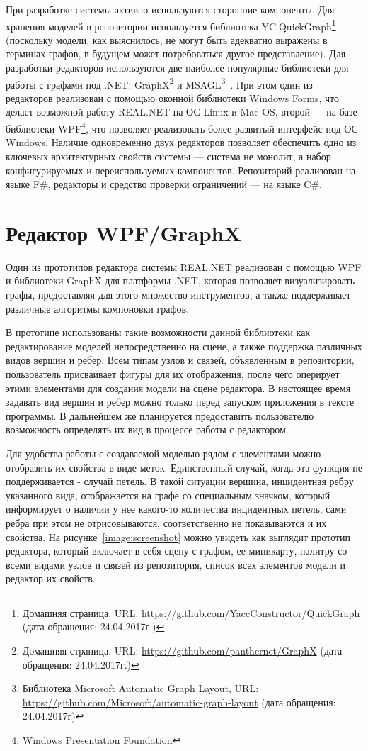\documentclass{spisok-article}
\begin{document}
При разработке системы активно используются сторонние компоненты. Для хранения моделей в репозитории используется библиотека YC.QuickGraph\footnote{Домашняя страница, URL: \url{https://github.com/YaccConstructor/QuickGraph} (дата обращения: 24.04.2017г.)} (поскольку модели, как выяснилось, не могут быть адекватно выражены в терминах графов, в будущем может потребоваться другое представление). Для разработки редакторов используются две наиболее популярные библиотеки для работы с графами под .NET: GraphX\footnote{Домашняя страница, URL: \url{https://github.com/panthernet/GraphX} (дата обращения: 24.04.2017г.)} и MSAGL\footnote{Библиотека Microsoft Automatic Graph Layout, URL: \url{https://github.com/Microsoft/automatic-graph-layout} (дата обращения: 24.04.2017г)}~\cite{pupyrev2010bundling}. При этом один из редакторов реализован с помощью оконной библиотеки Windows Forms, что делает возможной работу REAL.NET на ОС Linux и Mac OS, второй --- на базе библиотеки WPF\footnote{Windows Presentation Foundation}, что позволяет реализовать более развитый интерфейс под ОС Windows. Наличие одновременно двух редакторов позволяет обеспечить одно из ключевых архитектурных свойств системы --- система не монолит, а набор конфигурируемых и переиспользуемых компонентов. Репозиторий реализован на языке F\#, редакторы и средство проверки ограничений --- на языке C\#.

\section{Редактор WPF/GraphX}

Один из прототипов редактора системы REAL.NET реализован с помощью WPF и библиотеки GraphX для платформы .NET, которая позволяет визуализировать графы, предоставляя для этого множество инструментов, а также поддерживает различные алгоритмы компоновки графов.

В прототипе использованы такие возможности данной библиотеки как редактирование моделей непосредственно на сцене, а также поддержка различных видов вершин и ребер. Всем типам узлов и связей, объявленным в репозитории, пользователь присваивает фигуры для их отображения, после чего оперирует этими элементами для создания модели на сцене редактора. В настоящее время задавать вид вершин и ребер можно только перед запуском приложения в тексте программы. В дальнейшем же планируется предоставить пользователю возможность определять их вид в процессе работы с редактором. 

Для удобства работы с создаваемой моделью рядом с элементами можно отобразить их свойства в виде меток. Единственный случай, когда  эта функция не поддерживается - случай петель. В такой ситуации вершина, инцидентная ребру указанного вида, отображается на графе со специальным значком, который информирует о наличии у нее какого-то количества инцидентных петель, сами ребра при этом не отрисовываются, соответственно не показываются и их свойства. На рисунке~\ref{image:screenshot} можно увидеть как выглядит прототип редактора, который включает в себя сцену с графом, ее миникарту, палитру со всеми видами узлов и связей из репозитория, список всех элементов модели и редактор их свойств. 
\end{document}
